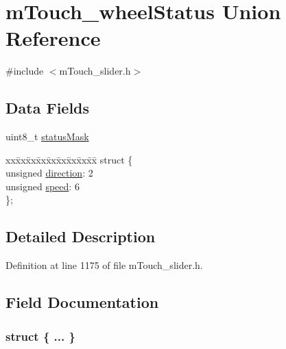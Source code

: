 \hypertarget{unionm_touch__wheel_status}{}\section{m\+Touch\+\_\+wheel\+Status Union Reference}
\label{unionm_touch__wheel_status}


{\ttfamily \#include $<$m\+Touch\+\_\+slider.\+h$>$}

\subsection*{Data Fields}
\begin{DoxyCompactItemize}
\item 
uint8\+\_\+t \hyperlink{unionm_touch__wheel_status_a05ac72aa6b98b42dfe3f0a8d13848480}{status\+Mask}
\item 
\begin{tabbing}
xx\=xx\=xx\=xx\=xx\=xx\=xx\=xx\=xx\=\kill
struct \{\\
\>unsigned \hyperlink{unionm_touch__wheel_status_a8e014f2c07c757619aefc8ff1024004c}{direction}: 2\\
\>unsigned \hyperlink{unionm_touch__wheel_status_a6f9843b883df5426450c0095d8892732}{speed}: 6\\
\}; \\

\end{tabbing}\end{DoxyCompactItemize}


\subsection{Detailed Description}


Definition at line 1175 of file m\+Touch\+\_\+slider.\+h.



\subsection{Field Documentation}
\hypertarget{unionm_touch__wheel_status_af5cd1136da91c8c0529617affe248123}{}\subsubsection[{"@459}]{\setlength{\rightskip}{0pt plus 5cm}struct \{ ... \} }\label{unionm_touch__wheel_status_af5cd1136da91c8c0529617affe248123}
\hypertarget{unionm_touch__wheel_status_a8e014f2c07c757619aefc8ff1024004c}{}

